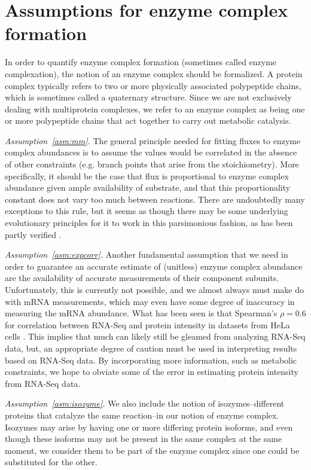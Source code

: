 \section{Assumptions for enzyme complex formation}
\label{sec:complexation}

In order to quantify enzyme complex formation (sometimes called enzyme
complexation), the notion of an enzyme complex should be formalized.
A protein complex typically refers to two or more physically
associated polypeptide chains, which is sometimes called a quaternary
structure. Since we are not exclusively dealing with multiprotein
complexes, we refer to an enzyme complex as being one or more
polypeptide chains that act together to carry out metabolic
catalysis.

\emph{Assumption~\ref{asm:mm}.} The general principle needed for
fitting fluxes to enzyme complex abundances is to assume the values
would be correlated in the absence of other constraints (e.g. branch
points that arise from the stoichiometry). More specifically, it
should be the case that flux is proportional to enzyme complex
abundance given ample availability of substrate, and that this
proportionality constant does not vary too much between reactions.
There are undoubtedly many exceptions to this rule, but it seems as
though there may be some underlying evolutionary principles for it to
work in this parsimonious fashion, as has been partly verified
\citep{Bennett2009}.

\emph{Assumption~\ref{asm:expcorr}.}  Another fundamental assumption
that we need in order to guarantee an accurate estimate of (unitless)
enzyme complex abundance are the availability of accurate measurements
of their component subunits. Unfortunately, this is currently not
possible, and we almost always must make do with mRNA measurements,
which may even have some degree of inaccuracy in measuring the mRNA
abundance. What has been seen is that Spearman's $\rho = 0.6$ for
correlation between RNA-Seq and protein intensity in datasets from
HeLa cells \citep{Nagaraj2011}. This implies that much can likely
still be gleamed from analyzing RNA-Seq data, but, an appropriate
degree of caution must be used in interpreting results based on
RNA-Seq data. By incorporating more information, such as metabolic
constraints, we hope to obviate some of the error in estimating
protein intensity from RNA-Seq data.

\emph{Assumption~\ref{asm:isozyme}.} We also include the notion of
isozymes--different proteins that catalyze the same reaction--in our
notion of enzyme complex. Isozymes may arise by having one or more
differing protein isoforms, and even though these isoforms may not be
present in the same complex at the same moment, we consider them to be
part of the enzyme complex since one could be substituted for the
other.

